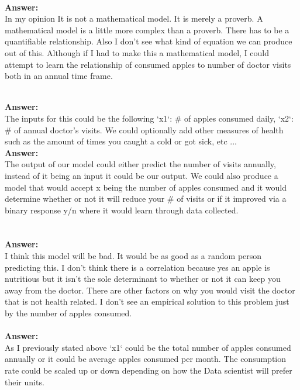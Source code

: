 \documentclass[12pt]{article}
\begin{document}
\begin{enumerate}


\\
\textbf{Answer: } \\
In my opinion It is not a mathematical model. It is merely a proverb. A mathematical model is a little more complex than a proverb. There has to be a quantifiable relationship. Also I don't see what kind of equation we can produce out of this. Although if I had to make this a mathematical model, I could attempt to learn the relationship of consumed apples to number of doctor visits both in an annual time frame.

\\
\textbf{Answer: } \\ 
The inputs for this could be the following `x1`: \# of apples consumed daily, `x2`: \# of annual doctor's visits. We could optionally add other measures of health such as the amount of times you caught a cold or got sick, etc ...
\\
\textbf{Answer: }\\ 
The output of our model could either predict the number of visits annually, instead of it being an input it could be our output. We could also produce a model that would accept x being the number of apples consumed and it would determine whether or not it will reduce your \# of visits or if it improved via a binary response y/n where it would learn through data collected. \\ 
\\

\\
\textbf{Answer: } \\ 
I think this model will be bad. It would be as good as a random person predicting this. I don't think there is a correlation because yes an apple is nutritious but it isn't the sole determinant to whether or not it can keep you away from the doctor. There are other factors on why you would visit the doctor that is not health related. I don't see an empirical solution to this problem just by the number of apples consumed.
\\

\\
\textbf{Answer: } \\
As I previously stated above `x1` could be the total number of apples consumed annually or it could be average apples consumed per month. The consumption rate could be scaled up or down depending on how the Data scientist will prefer their units.\\


\end{enumerate}
\end{document}
